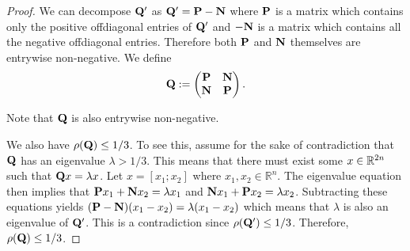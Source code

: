 \begin{proof} We can decompose $\mathbf{Q}'$ as $\mathbf{Q}' = \mathbf{P} - \mathbf{N}$ where $\mathbf{P}$ is a matrix which contains only the positive offdiagonal entries of $\mathbf{Q}'$ and $-\mathbf{N}$ is a matrix which contains all the negative offdiagonal entries. Therefore both $\mathbf{P}$ and $\mathbf{N}$ themselves are entrywise non-negative. We define
\begin{align*}
    \mathbf{Q} :=  \begin{pmatrix}
        \mathbf{P} & \mathbf{N} \\
        \mathbf{N} & \mathbf{P}
    \end{pmatrix}.
\end{align*}
 
Note that $\mathbf{Q}$ is also entrywise non-negative.


We also have $\rho (\mathbf{Q}) \leq 1/3$. To see this, assume for the sake of contradiction that $\mathbf{Q}$ has an eigenvalue $\lambda > 1/3$. This means that there must exist some $x \in \mathbb{R}^{2n}$ such that $\mathbf{Q} x = \lambda x$. Let $x = [x_1; x_2]$ where $x_1, x_2 \in \mathbb{R}^n$. The eigenvalue equation then implies that $\mathbf{P} x_1 + \mathbf{N} x_2 = \lambda x_1$ and $\mathbf{N} x_1 + \mathbf{P} x_2 = \lambda x_2$. Subtracting these equations yields $(\mathbf{P} - \mathbf{N})(x_1 - x_2) = \lambda (x_1 - x_2)$ which means that $\lambda$ is also an eigenvalue of $\mathbf{Q}'$. This is a contradiction since $\rho(\mathbf{Q}') \leq 1/3$. Therefore, $\rho(\mathbf{Q}) \leq 1/3$.


\end{proof}
